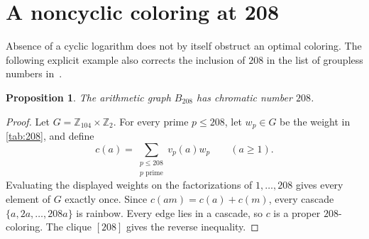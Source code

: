 \documentclass[11pt,reqno]{amsart}
\newcommand{\Z}{\mathbb Z}
\newtheorem{proposition}[theorem]{Proposition}
\theoremstyle{definition}
\theoremstyle{remark}
\numberwithin{equation}{section}
\begin{document}
\section{A noncyclic coloring at 208}\label{sec:208}

Absence of a cyclic logarithm does not by itself obstruct an optimal
coloring. The following explicit example also corrects the inclusion of
$208$ in the list of groupless numbers in~\cite[Table~5.1]{CCP}.

\begin{proposition}\label{prop:208}
The arithmetic graph $B_{208}$ has chromatic number $208$.
\end{proposition}

\begin{proof}
Let $G=\Z_{104}\times\Z_2$.
For every prime $p\le208$, let $w_p\in G$ be the weight in
\cref{tab:208}, and define
\[
 c(a)=\sum_{\substack{p\le208\\p\text{ prime}}}v_p(a)w_p
 \qquad(a\ge1).
\]
Evaluating the displayed weights on the factorizations of
$1,\ldots,208$ gives every element of $G$ exactly once. Since
$c(am)=c(a)+c(m)$, every cascade $\{a,2a,\ldots,208a\}$ is rainbow.
Every edge lies in a cascade, so $c$ is a proper $208$-coloring.
The clique $[208]$ gives the reverse inequality.
\end{proof}
\end{document}
